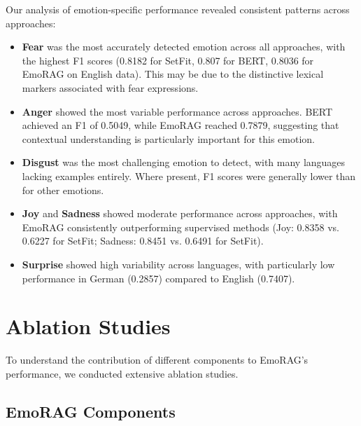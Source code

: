 \documentclass[a4paper,12pt]{extarticle}
\begin{document}

Our analysis of emotion-specific performance revealed consistent patterns across approaches:

\begin{itemize}
\item \textbf{Fear} was the most accurately detected emotion across all approaches, with the highest F1 scores (0.8182 for SetFit, 0.807 for BERT, 0.8036 for EmoRAG on English data). This may be due to the distinctive lexical markers associated with fear expressions.

\item \textbf{Anger} showed the most variable performance across approaches. BERT achieved an F1 of 0.5049, while EmoRAG reached 0.7879, suggesting that contextual understanding is particularly important for this emotion.

\item \textbf{Disgust} was the most challenging emotion to detect, with many languages lacking examples entirely. Where present, F1 scores were generally lower than for other emotions.

\item \textbf{Joy} and \textbf{Sadness} showed moderate performance across approaches, with EmoRAG consistently outperforming supervised methods (Joy: 0.8358 vs. 0.6227 for SetFit; Sadness: 0.8451 vs. 0.6491 for SetFit).

\item \textbf{Surprise} showed high variability across languages, with particularly low performance in German (0.2857) compared to English (0.7407).
\end{itemize}


\section{Ablation Studies}

To understand the contribution of different components to EmoRAG's performance, we conducted extensive ablation studies.

\subsection{EmoRAG Components}
\end{document}
